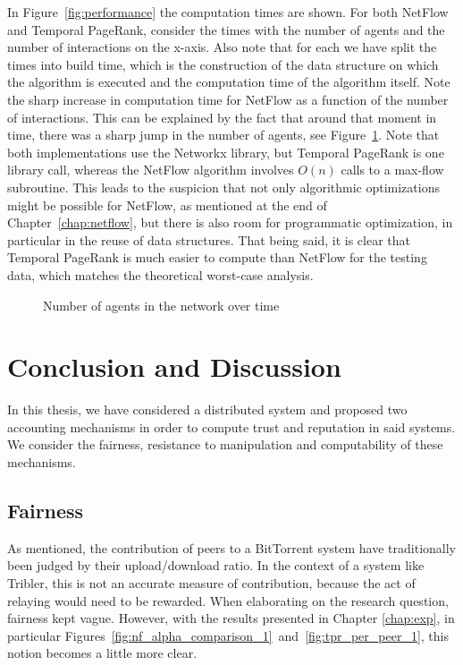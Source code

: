 \documentclass[a4paper,11pt]{book}
\theoremstyle{definition}
\begin{document}
In Figure~\ref{fig:performance} the computation times are shown. For both NetFlow and Temporal PageRank,
consider the times with the number of agents and the number of interactions on the x-axis. Also note
that for each we have split the times into build time, which is the construction of the data structure
on which the algorithm is executed and the computation time of the algorithm itself. Note the sharp
increase in computation time for NetFlow as a function of the number of interactions. This can be
explained by the fact that around that moment in time, there was a sharp jump in the number of agents,
see Figure~\ref{fig:evolution}. Note that both implementations use the Networkx library, but 
Temporal PageRank is one library call, whereas the NetFlow algorithm involves $O(n)$ calls to
a max-flow subroutine. This leads to the suspicion that not only algorithmic optimizations might
be possible for NetFlow, as mentioned at the end of Chapter~\ref{chap:netflow}, but there is also
room for programmatic optimization, in particular in the reuse of data structures. That
being said, it is clear that Temporal PageRank is much easier to compute than NetFlow for 
the testing data, which matches the theoretical worst-case analysis.

\begin{figure}[ht]
    \centering
    
    \caption{Number of agents in the network over time}
    \label{fig:evolution}
\end{figure}








\chapter{Conclusion and Discussion}
\label{chap:conclusion}

In this thesis, we have considered a distributed system and proposed two accounting mechanisms
in order to compute trust and reputation in said systems. We consider the fairness, resistance
to manipulation and computability of these mechanisms.

\section{Fairness}

As mentioned, the contribution of peers to a BitTorrent system have traditionally been judged by their
upload/download ratio. In the context of a system like Tribler, this is not an accurate
measure of contribution, because the act of relaying would need to be rewarded. When elaborating on
the research question, fairness kept vague. However, with the results
presented in Chapter \ref{chap:exp}, in particular 
Figures~\ref{fig:nf_alpha_comparison_1}~and~\ref{fig:tpr_per_peer_1},
this notion becomes a little more clear. 
\end{document}
